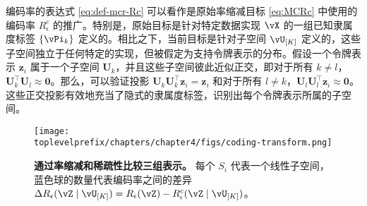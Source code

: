 \documentclass[../../book-main_zh.tex]{subfiles}
\begin{document}
\begin{remark}
    编码率的表达式 \eqref{eq:def-mcr-Rc} 可以看作是原始率缩减目标 \eqref{eq:MCRc} 中使用的编码率 \(R_\epsilon^{c}\) 的推广。特别是，原始目标是针对特定数据实现 \(\vX\) 的一组已知隶属度标签 \(\{\vPi_{k}\}\) 定义的。相比之下，当前目标是针对子空间 \(\vU_{[K]}\) 定义的，这些子空间独立于任何特定的实现，但被假定为支持令牌表示的分布。假设一个令牌表示 $\bm z_i$ 属于一个子空间 $\bm U_k$，并且这些子空间彼此近似正交，即对于所有 $k \neq l$，$\bm U_k^\top \bm U_l \approx \bm 0$。那么，可以验证投影 $\bm U_k\bm U_k^\top \bm z_i  = \bm z_i$ 和对于所有 $l \neq k$，$\bm U_l\bm U_l^\top \bm z_i \approx \bm 0$。这些正交投影有效地充当了隐式的隶属度标签，识别出每个令牌表示所属的子空间。
\end{remark}



\begin{figure}[t!]
     \centering
         \texttt{[image: \\toplevelprefix/chapters/chapter4/figs/coding-transform.png]}
     \caption{ \small\textbf{通过率缩减和稀疏性比较三组表示。} 每个 $S_i$ 代表一个线性子空间，蓝色球的数量代表编码率之间的差异 $\Delta R_{\epsilon}(\vZ \mid \vU_{[K]}) = R_\epsilon(\vZ) - R^c_\epsilon(\vZ \mid \vU_{[K]})$。
     }
        \label{fig:sparse-rate-reduction-diagram}
\end{figure}
\end{document}
